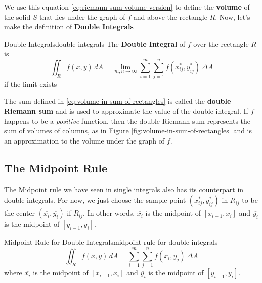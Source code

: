 \documentclass[math,code]{amznotes}
\theoremstyle{remark}
\begin{document}
We use this equation \eqref{eq:riemann-sum-volume-version} to define the \textbf{volume} of the solid $S$ that lies under the graph of $f$ and above the rectangle $R$. Now, let's make the definition of {\color{red} \textbf{Double Integrals}}
\begin{dfnbox}{Double Integrals}{double-integrals}
    The {\color{red} \textbf{Double Integral}} of $f$ over the rectangle $R$ is
    \begin{displaymath}
        \iint_R f(x,y) \,dA = \lim\limits_{m,n \to \infty} \sum_{i=1}^{m} \sum_{j=1}^{n} f(x_{ij}^{*},y_{ij}^{*}) ~\Delta A
    \end{displaymath}
    if the limit exists
\end{dfnbox}
The sum defined in \eqref{eq:volume-in-sum-of-rectangles} is called the {\color{red} \textbf{double Riemann sum}} and is used to approximate the value of the double integral. If $f$ happens to be a \textit{positive} function, then the double Riemann sum represents the sum of volumes of columns, as in Figure \ref{fig:volume-in-sum-of-rectangles} and is an approximation to the volume under the graph of $f$.
\subsection{The Midpoint Rule}
The Midpoint rule we have seen in single integrals also has its counterpart in double integrals. For now, we just choose the sample point $(x_{ij}^*, y_{ij}^*)$ in $R_{ij}$ to be the center $(\overline{x_i}, \overline{y_i})$ if $R_{ij}$. In other words, $\overline{x_i}$ is the midpoint of $[x_{i-1}, x_i]$ and $\overline{y_i}$ is the midpoint of $[y_{i-1}, y_i]$.
\begin{thmbox}{Midpoint Rule for Double Integrals}{midpoint-rule-for-double-integrals}
    \begin{displaymath}
        \iint_R f(x,y) \,dA = \sum_{i=1}^{m} \sum_{j=1}^{n} f(\overline{x_{i}},\overline{y_{j}}) ~\Delta A
    \end{displaymath}
    where $\overline{x_i}$ is the midpoint of $[x_{i-1}, x_i]$ and $\overline{y_i}$ is the midpoint of $[y_{i-1}, y_i]$.
\end{thmbox}
\end{document}
